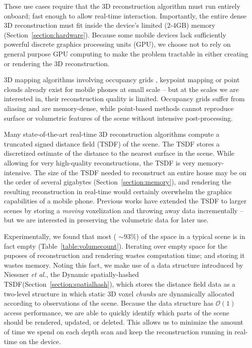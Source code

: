 \documentclass[conference]{IEEEtran}
\newcommand{\sref}[1]{Section~\ref{#1}}
\newcommand{\tabref}[1]{Table~\ref{#1}}
\newcommand{\etal}{\textit{et al.}\xspace}
\newcommand{\TSDF}{TSDF\xspace}
\begin{document}
These use cases require that the 3D reconstruction algorithm must run entirely
onboard; fast enough to allow real-time interaction. Importantly, the entire
dense 3D reconstruction must fit inside the device's limited (2-4GB) memory
(\sref{section:hardware}). Because some mobile devices  lack sufficiently
powerful discrete graphics processing units (GPU), we choose not to rely on general
purpose GPU computing to make the problem tractable in either creating or
rendering the 3D reconstruction.

3D mapping algorithms involving occupancy grids \cite{Elfes1989}, keypoint
mapping \cite{KleinSparse} or point clouds \cite{RusinkiewiczPoints,
TanskanenMetric, WeiseScanning} already exist for mobile phones at small scale
-- but at the scales we are interested in, their reconstruction quality is
limited. Occupancy grids suffer from aliasing and are memory-dense, while
point-based methods cannot reproduce surface or volumetric features of the scene
without intensive post-processing.

Many state-of-the-art real-time 3D reconstruction algorithms \cite{Newcombe,
Whelan2013,WhelanLoopClose,Bylow2013,NiessnerHashing} compute a truncated
signed distance field (\TSDF) \cite{Curless1996} of the scene. The \TSDF stores a
discretized estimate of the distance to the nearest surface in the scene. While
allowing for very high-quality reconstructions, the \TSDF is very
memory-intensive. The size of the \TSDF needed to reconstruct an entire house
may be on the order of several gigabytes  (\sref{section:memory}), and
rendering the resulting reconstruction in real-time would certainly overwhelm
the graphics capabilities of a mobile phone. Previous works \cite{Whelan2013,
WhelanLoopClose} have extended the \TSDF to larger scenes by storing a
\textit{moving} voxelization and throwing away data incrementally -- but we are
interested in preserving the volumetric data for later use.

Experimentally, we found that most ( $\sim 93\%$) of the space in a typical
scene is in fact empty (\tabref{table:volumecount}). Iterating over empty space
for the puposes of reconstruction and rendering wastes computation time; and storing it
wastes memory. Noting this fact, we make use of a data structure introduced by
Niessner \etal \cite{NiessnerHashing}, the Dynamic spatially-hashed
\cite{SpatialHashing} \TSDF (\sref{section:spatialhash}), which stores the
distance field data as a two-level structure in which static 3D voxel
\textit{chunks} are dynamically allocated according to observations
of the scene. Because the data structure has $\mathcal{O}(1)$ access
performance, we are able to quickly identify which parts of the scene should be
rendered, updated, or deleted. This allows us to minimize the amount of time we
spend on each depth scan and keep the reconstruction running in real-time on the device.
\end{document}

